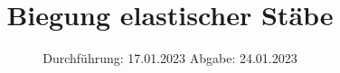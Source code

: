 

%

\subject{V103}
\title{Biegung elastischer Stäbe}
\date{%
  Durchführung: 17.01.2023
  \hspace{3em}
  Abgabe: 24.01.2023
}


\setlength{\parindent}{0pt} %

\maketitle
\thispagestyle{empty}
\tableofcontents
\newpage



%



\printbibliography{}




